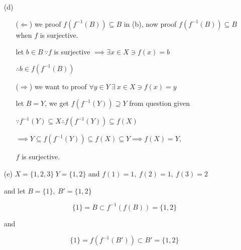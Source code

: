 \newpage

\begin{tcolorbox}
	\begin{enumerate}[wide]
		\item[(d)] 
		
		\begin{enumerate}[wide]
			\item[($\Leftarrow$)]
				we proof $f(f^{-1}(B)) \subseteq B$ in (b), now proof $f(f^{-1}(B)) \subseteq B$ when $f$ is surjective.
				
				let $b \in B ~\because f$ is surjective $\implies \exists x \in X \ni f(x) = b$
				
				$\therefore b \in f(f^{-1}(B))$
			\item[($\Rightarrow$)]
			 we want to proof $\forall y \in Y ~\exists~ x \in X \ni f(x) = y$
			 
			 let $B = Y$, we get $f(f^{-1}(Y)) \supseteq Y$ from question given
			 
			 $\because f^{-1}(Y) \subseteq X \therefore f(f^{-1}(Y)) \subseteq f(X)$
			 
			 $\implies Y \subseteq f(f^{-1}(Y)) \subseteq f(X) \subseteq Y \implies f(X) = Y,$
			 
			 $f$ is surjective.
		\end{enumerate}
		\item[(e)] $X = \{1,2,3\}~Y=\{1,2\}$ and $f(1) = 1,~f(2) = 1,~f(3) = 2$
		
		and let $B = \{1\},~B' = \{1,2\}$
		
		$$\{1\} = B \subset f^{-1}(f(B)) = \{1,2\}$$
		
		and 
		
		$$\{1\} = f(f^{-1}(B')) \subset B' = \{1,2\}$$
	\end{enumerate}
\end{tcolorbox}
